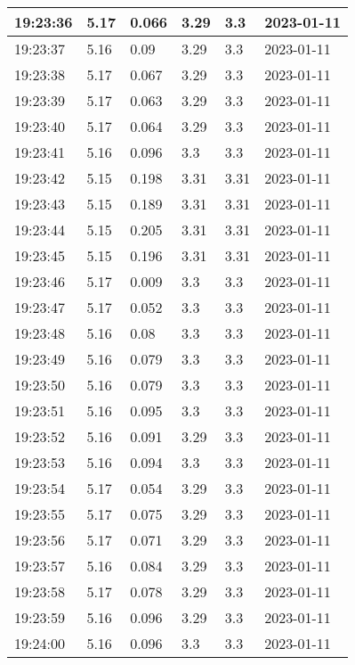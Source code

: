 \begin{longtable}{|l|l|l|l|l|l|}
        19:23:36 & 5.17 & 0.066 & 3.29 & 3.3 & 2023-01-11 \\ \hline
        19:23:37 & 5.16 & 0.09 & 3.29 & 3.3 & 2023-01-11 \\ \hline
        19:23:38 & 5.17 & 0.067 & 3.29 & 3.3 & 2023-01-11 \\ \hline
        19:23:39 & 5.17 & 0.063 & 3.29 & 3.3 & 2023-01-11 \\ \hline
        19:23:40 & 5.17 & 0.064 & 3.29 & 3.3 & 2023-01-11 \\ \hline
        19:23:41 & 5.16 & 0.096 & 3.3 & 3.3 & 2023-01-11 \\ \hline
        19:23:42 & 5.15 & 0.198 & 3.31 & 3.31 & 2023-01-11 \\ \hline
        19:23:43 & 5.15 & 0.189 & 3.31 & 3.31 & 2023-01-11 \\ \hline
        19:23:44 & 5.15 & 0.205 & 3.31 & 3.31 & 2023-01-11 \\ \hline
        19:23:45 & 5.15 & 0.196 & 3.31 & 3.31 & 2023-01-11 \\ \hline
        19:23:46 & 5.17 & 0.009 & 3.3 & 3.3 & 2023-01-11 \\ \hline
        19:23:47 & 5.17 & 0.052 & 3.3 & 3.3 & 2023-01-11 \\ \hline
        19:23:48 & 5.16 & 0.08 & 3.3 & 3.3 & 2023-01-11 \\ \hline
        19:23:49 & 5.16 & 0.079 & 3.3 & 3.3 & 2023-01-11 \\ \hline
        19:23:50 & 5.16 & 0.079 & 3.3 & 3.3 & 2023-01-11 \\ \hline
        19:23:51 & 5.16 & 0.095 & 3.3 & 3.3 & 2023-01-11 \\ \hline
        19:23:52 & 5.16 & 0.091 & 3.29 & 3.3 & 2023-01-11 \\ \hline
        19:23:53 & 5.16 & 0.094 & 3.3 & 3.3 & 2023-01-11 \\ \hline
        19:23:54 & 5.17 & 0.054 & 3.29 & 3.3 & 2023-01-11 \\ \hline
        19:23:55 & 5.17 & 0.075 & 3.29 & 3.3 & 2023-01-11 \\ \hline
        19:23:56 & 5.17 & 0.071 & 3.29 & 3.3 & 2023-01-11 \\ \hline
        19:23:57 & 5.16 & 0.084 & 3.29 & 3.3 & 2023-01-11 \\ \hline
        19:23:58 & 5.17 & 0.078 & 3.29 & 3.3 & 2023-01-11 \\ \hline
        19:23:59 & 5.16 & 0.096 & 3.29 & 3.3 & 2023-01-11 \\ \hline
        19:24:00 & 5.16 & 0.096 & 3.3 & 3.3 & 2023-01-11 \\ \hline

\end{longtable}
